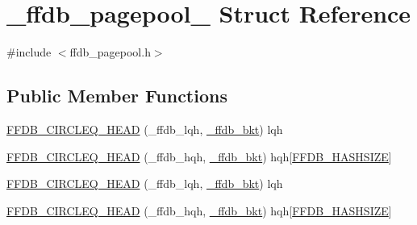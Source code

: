 \hypertarget{struct__ffdb__pagepool__}{}\section{\+\_\+ffdb\+\_\+pagepool\+\_\+ Struct Reference}
\label{struct__ffdb__pagepool__}


{\ttfamily \#include $<$ffdb\+\_\+pagepool.\+h$>$}

\subsection*{Public Member Functions}
\begin{DoxyCompactItemize}
\item 
\mbox{\hyperlink{struct__ffdb__pagepool___a79c89b7ffac9b5303ed9e38be070120e}{F\+F\+D\+B\+\_\+\+C\+I\+R\+C\+L\+E\+Q\+\_\+\+H\+E\+AD}} (\+\_\+ffdb\+\_\+lqh, \mbox{\hyperlink{struct__ffdb__bkt}{\+\_\+ffdb\+\_\+bkt}}) lqh
\item 
\mbox{\hyperlink{struct__ffdb__pagepool___a96aa19721486d848d70d403dad214389}{F\+F\+D\+B\+\_\+\+C\+I\+R\+C\+L\+E\+Q\+\_\+\+H\+E\+AD}} (\+\_\+ffdb\+\_\+hqh, \mbox{\hyperlink{struct__ffdb__bkt}{\+\_\+ffdb\+\_\+bkt}}) hqh\mbox{[}\mbox{\hyperlink{adat__devel_2other__libs_2filedb_2filehash_2ffdb__pagepool_8h_abe1c2fbde9b4b6a95b8a164d7479286f}{F\+F\+D\+B\+\_\+\+H\+A\+S\+H\+S\+I\+ZE}}\mbox{]}
\item 
\mbox{\hyperlink{struct__ffdb__pagepool___a79c89b7ffac9b5303ed9e38be070120e}{F\+F\+D\+B\+\_\+\+C\+I\+R\+C\+L\+E\+Q\+\_\+\+H\+E\+AD}} (\+\_\+ffdb\+\_\+lqh, \mbox{\hyperlink{struct__ffdb__bkt}{\+\_\+ffdb\+\_\+bkt}}) lqh
\item 
\mbox{\hyperlink{struct__ffdb__pagepool___a96aa19721486d848d70d403dad214389}{F\+F\+D\+B\+\_\+\+C\+I\+R\+C\+L\+E\+Q\+\_\+\+H\+E\+AD}} (\+\_\+ffdb\+\_\+hqh, \mbox{\hyperlink{struct__ffdb__bkt}{\+\_\+ffdb\+\_\+bkt}}) hqh\mbox{[}\mbox{\hyperlink{adat__devel_2other__libs_2filedb_2filehash_2ffdb__pagepool_8h_abe1c2fbde9b4b6a95b8a164d7479286f}{F\+F\+D\+B\+\_\+\+H\+A\+S\+H\+S\+I\+ZE}}\mbox{]}
\end{DoxyCompactItemize}
